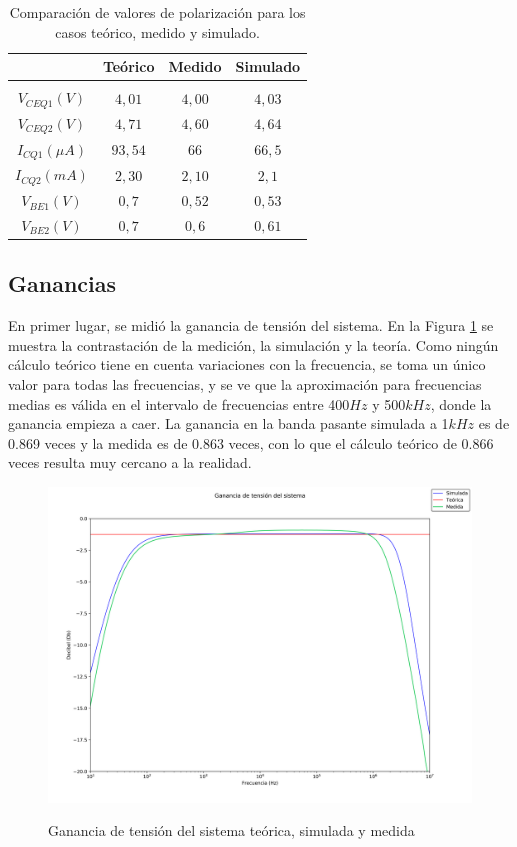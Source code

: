 	\begin{table}[h!]
		\centering
		\begin{tabular}{c c c c}%
			\bfseries &Te\'orico & Medido & Simulado \\ \hline \\
			$V_{CEQ1} (V)$ & $4,01$ &$4,00$ & $4,03$ \\
			$V_{CEQ2} (V)$ & $4,71$& $4,60$& $4,64$\\
			$I_{CQ1} (\mu A)$ & $93,54$&$66$ & $66,5$\\
			$I_{CQ2} (mA)$ &$2,30$ & $2,10$& $2,1$\\
			$V_{BE1} (V)$ &$0,7$ &$0,52$ & $0,53$\\
			$V_{BE2} (V)$ & $0,7$& $0,6$& $0,61$\\
			\hline
		\end{tabular}
		\caption{Comparaci\'on de valores de polarizaci\'on para los casos te\'orico, medido y simulado.}
		\label{tabla_polarizacion_comp}
	\end{table}

\subsection{Ganancias}
En primer lugar, se midió la ganancia de tensión del sistema. En la Figura \ref{fig_bode_avs} se muestra la contrastación de la medición, la simulación y la teoría. Como ningún cálculo teórico tiene en cuenta variaciones con la frecuencia, se toma un único valor para todas las frecuencias, y se ve que la aproximación para frecuencias medias es válida en el intervalo de frecuencias entre 400$Hz$ y 500$kHz$, donde la ganancia empieza a caer. La ganancia en la banda pasante simulada a 1$kHz$ es de 0.869 veces y la medida es de 0.863 veces, con lo que el cálculo teórico de 0.866 veces resulta muy cercano a la realidad.

	\begin{figure}[H]
		\centering
		\includegraphics[scale=0.4]{./Imagenes/bode_Avs.png} \\
		\caption{Ganancia de tensión del sistema teórica, simulada y medida}
		\label{fig_bode_avs}
	\end{figure}

